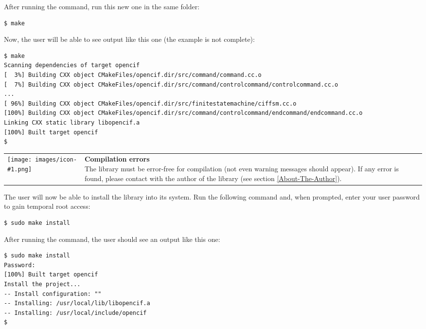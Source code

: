 \documentclass[11pt,twoside,openany,x11names,svgnames]{memoir}
\makeatletter
\newcommand{\IconNote}[3]
{
	\begin{table}[ht]
	\begin{tabular}{ lm{\dimexpr\textwidth-8\tabcolsep-\wd0}@{}}
		\toprule
		\texttt{[image: images/icon-\#1.png]}
		&
		\parbox[t]{155mm}{
		\textbf{#2} \\
		#3
		}
	\end{tabular}
\end{table}
}
\makeatother
\begin{document}
After running the command, run this new one in the same folder:

\begin{lstlisting}[frame=single,style=SystemCommandStyle]
$ make
\end{lstlisting}

Now, the user will be able to see output like this one (the example is not complete):

\begin{lstlisting}[frame=single,style=SystemCommandStyle]
$ make
Scanning dependencies of target opencif
[  3%] Building CXX object CMakeFiles/opencif.dir/src/command/command.cc.o
[  7%] Building CXX object CMakeFiles/opencif.dir/src/command/controlcommand/controlcommand.cc.o
...
[ 96%] Building CXX object CMakeFiles/opencif.dir/src/finitestatemachine/ciffsm.cc.o                                                                                                                                                         
[100%] Building CXX object CMakeFiles/opencif.dir/src/command/controlcommand/endcommand/endcommand.cc.o                                                                                                                                      
Linking CXX static library libopencif.a                                                                                                                                                                                                      
[100%] Built target opencif
$
\end{lstlisting}

\IconNote
	{warning}
	{Compilation errors}
	{The library must be error-free for compilation (not even warning messages should appear). If any error is found, please contact with the author of the library (see section \ref{About-The-Author}).}

The user will now be able to install the library into its system. Run the following command and, when prompted, enter your user password to gain temporal root access:

\begin{lstlisting}[frame=single,style=SystemCommandStyle]
$ sudo make install
\end{lstlisting}

After running the command, the user should see an output like this one:

\begin{lstlisting}[frame=single,style=SystemCommandStyle]
$ sudo make install
Password:
[100%] Built target opencif
Install the project...
-- Install configuration: ""
-- Installing: /usr/local/lib/libopencif.a
-- Installing: /usr/local/include/opencif
$
\end{lstlisting}
\end{document}
